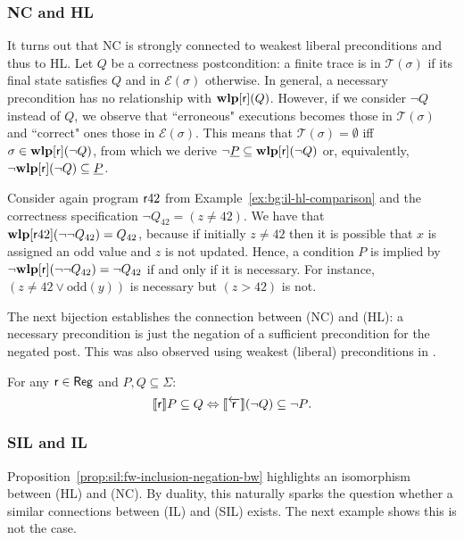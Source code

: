 \subsubsection{NC and HL}
It turns out that NC is strongly connected to weakest liberal preconditions and thus to HL.
Let $Q$ be a correctness postcondition: a finite trace is in $\mathcal{T}(\sigma)$ if its final state satisfies $Q$ and in $\mathcal{E}(\sigma)$ otherwise. In general, a necessary precondition has no relationship with $\textbf{wlp}[\mathsf{r}](Q)$. However, if we consider $\lnot Q$ instead of $Q$, we observe that ``erroneous" executions becomes those in $\mathcal{T}(\sigma)$ and ``correct" ones those in $\mathcal{E}(\sigma)$.
This means that $\mathcal{T}(\sigma) = \emptyset$ iff $\sigma \in \textbf{wlp}[\mathsf{r}](\lnot Q)$, from which we derive $\lnot \underline{P} \subseteq \textbf{wlp}[\mathsf{r}](\lnot Q)$ or, equivalently, $\lnot \textbf{wlp}[\mathsf{r}](\lnot Q) \subseteq \underline{P}$.

\begin{example}
	Consider again program $\mathsf{r} 42$ from Example~\ref{ex:bg:il-hl-comparison} and the correctness specification $\lnot Q_{42} = (z\neq 42)$. We have that $\textbf{wlp}[\mathsf{r} 42](\lnot \lnot Q_{42}) = Q_{42}$, because if initially $z \neq 42$ then it is possible that $x$ is assigned an odd value and $z$ is not updated.
	Hence, a condition $P$ is implied by $\lnot \textbf{wlp}[\mathsf{r}](\lnot\lnot Q_{42}) = \lnot Q_{42}$ if and only if it is necessary. For instance, $(z \neq 42 \lor \text{odd}(y))$ is necessary but $(z > 42)$ is not.
\end{example}

The next bijection establishes the connection between (NC) and (HL): a necessary precondition is just the negation of a sufficient precondition for the negated post. This was also observed using weakest (liberal) preconditions in \cite[Theorem~5.4]{ZK22}.

\begin{prop}\label{prop:sil:fw-inclusion-negation-bw}
	For any  $\mathsf{r}\in \mathsf{Reg}$ and $P, Q \subseteq \Sigma$:
	\[
	\llbracket\mathsf{r}\rrbracket P \subseteq Q \Leftrightarrow \llbracket\overleftarrow{\mathsf{r}}\rrbracket (\lnot Q) \subseteq \lnot P \text{.}
	\]
\end{prop}

\subsubsection{SIL and IL}
Proposition~\ref{prop:sil:fw-inclusion-negation-bw} highlights an isomorphism between (HL) and (NC). By duality, this naturally sparks the question whether a similar connections between (IL) and (SIL) exists. The next example shows this is not the case.

